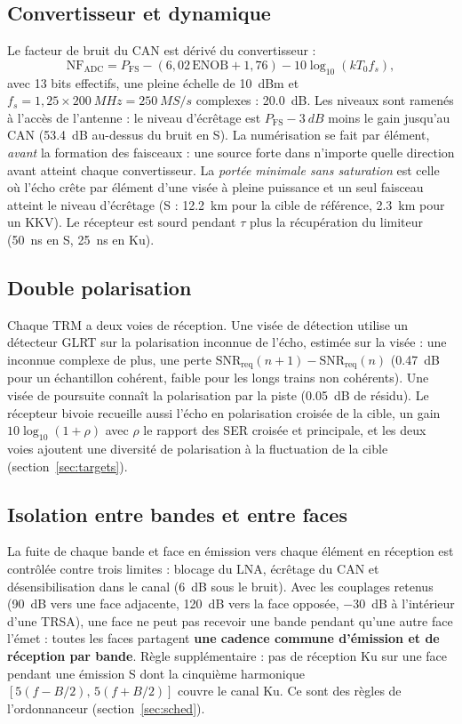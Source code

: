 \documentclass[11pt,a4paper]{article}
\newcommand{\SNR}{\mathrm{SNR}}
\begin{document}
\subsection{Convertisseur et dynamique}
Le facteur de bruit du CAN est dérivé du convertisseur :
\[
  \mathrm{NF}_{\mathrm{ADC}} = P_{\mathrm{FS}} - (6,02\,\mathrm{ENOB} + 1,76) - 10\log_{10}(k T_0 f_s),
\]
avec 13 bits effectifs, une pleine échelle de \SI{+10}{dBm} et $f_s = 1,25\times\SI{200}{MHz} = \SI{250}{MS/s}$
complexes : \SI{20.0}{dB}. Les niveaux sont ramenés à l'accès de l'antenne : le niveau d'écrêtage est
$P_{\mathrm{FS}} - \SI{3}{dB}$ moins le gain jusqu'au CAN (\SI{53.4}{dB} au-dessus du bruit en S). La numérisation se
fait par élément, \emph{avant} la formation des faisceaux : une source forte dans n'importe quelle direction avant
atteint chaque convertisseur. La \emph{portée minimale sans saturation} est celle où l'écho crête par élément d'une
visée à pleine puissance et un seul faisceau atteint le niveau d'écrêtage (S : \SI{12.2}{km} pour la cible de
référence, \SI{2.3}{km} pour un KKV). Le récepteur est sourd pendant $\tau$ plus la récupération du limiteur
(\SI{50}{ns} en S, \SI{25}{ns} en Ku).

\subsection{Double polarisation}
Chaque TRM a deux voies de réception. Une visée de détection utilise un détecteur GLRT sur la polarisation inconnue de
l'écho, estimée sur la visée : une inconnue complexe de plus, une perte $\SNR_{\mathrm{req}}(n+1)-\SNR_{\mathrm{req}}(n)$
(\SI{0.47}{dB} pour un échantillon cohérent, faible pour les longs trains non cohérents). Une visée de poursuite connaît
la polarisation par la piste (\SI{0.05}{dB} de résidu). Le récepteur bivoie recueille aussi l'écho en polarisation
croisée de la cible, un gain $10\log_{10}(1+\rho)$ avec $\rho$ le rapport des SER croisée et principale, et les deux
voies ajoutent une diversité de polarisation à la fluctuation de la cible (section~\ref{sec:targets}).

\subsection{Isolation entre bandes et entre faces}
La fuite de chaque bande et face en émission vers chaque élément en réception est contrôlée contre trois limites :
blocage du LNA, écrêtage du CAN et désensibilisation dans le canal (\SI{6}{dB} sous le bruit). Avec les couplages
retenus (\SI{90}{dB} vers une face adjacente, \SI{120}{dB} vers la face opposée, \SI{-30}{dB} à l'intérieur d'une
TRSA), une face ne peut pas recevoir une bande pendant qu'une autre face l'émet : toutes les faces partagent
\textbf{une cadence commune d'émission et de réception par bande}. Règle supplémentaire : pas de réception Ku sur une
face pendant une émission S dont la cinquième harmonique $[5(f-B/2),\,5(f+B/2)]$ couvre le canal Ku. Ce sont des
règles de l'ordonnanceur (section~\ref{sec:sched}).
\end{document}
